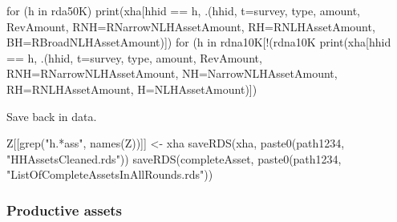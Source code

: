 
\begin{Schunk}
\begin{Sinput}
for (h in rda50K)
  print(xha[hhid == h, .(hhid, t=survey, type, amount, RevAmount,
    RNH=RNarrowNLHAssetAmount, RH=RNLHAssetAmount, BH=RBroadNLHAssetAmount)])
for (h in rdna10K[!(rdna10K %in% rda50K)])
  print(xha[hhid == h, .(hhid, t=survey, type, amount, RevAmount, 
    RNH=RNarrowNLHAssetAmount, NH=NarrowNLHAssetAmount, 
    RH=RNLHAssetAmount, H=NLHAssetAmount)])
\end{Sinput}
\end{Schunk}
Save back in data.
\begin{Schunk}
\begin{Sinput}
Z[[grep("h.*ass", names(Z))]] <- xha
saveRDS(xha, paste0(path1234, "HHAssetsCleaned.rds"))
saveRDS(completeAsset, paste0(path1234, "ListOfCompleteAssetsInAllRounds.rds"))
\end{Sinput}
\end{Schunk}


\subsubsection{Productive assets}




